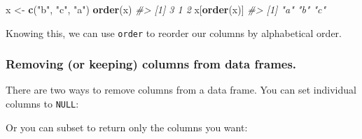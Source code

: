 \documentclass[]{book}
\newenvironment{Shaded}{\begin{snugshade}}{\end{snugshade}}
\newcommand{\KeywordTok}[1]{\textcolor[rgb]{0.13,0.29,0.53}{\textbf{#1}}}
\newcommand{\DataTypeTok}[1]{\textcolor[rgb]{0.13,0.29,0.53}{#1}}
\newcommand{\StringTok}[1]{\textcolor[rgb]{0.31,0.60,0.02}{#1}}
\newcommand{\CommentTok}[1]{\textcolor[rgb]{0.56,0.35,0.01}{\textit{#1}}}
\newcommand{\OtherTok}[1]{\textcolor[rgb]{0.56,0.35,0.01}{#1}}
\newcommand{\OperatorTok}[1]{\textcolor[rgb]{0.81,0.36,0.00}{\textbf{#1}}}
\newcommand{\NormalTok}[1]{#1}
\begin{document}
\begin{Shaded}
\begin{Highlighting}[]
\NormalTok{x <-}\StringTok{ }\KeywordTok{c}\NormalTok{(}\StringTok{"b"}\NormalTok{, }\StringTok{"c"}\NormalTok{, }\StringTok{"a"}\NormalTok{)}
\KeywordTok{order}\NormalTok{(x)}
\CommentTok{#> [1] 3 1 2}
\NormalTok{x[}\KeywordTok{order}\NormalTok{(x)]}
\CommentTok{#> [1] "a" "b" "c"}
\end{Highlighting}
\end{Shaded}

Knowing this, we can use \texttt{order} to reorder our columns by
alphabetical order.

\subsubsection*{Removing (or keeping) columns from data
frames.}\label{removing-or-keeping-columns-from-data-frames.}

There are two ways to remove columns from a data frame. You can set
individual columns to \texttt{NULL}:

\begin{Shaded}
\end{Shaded}

Or you can subset to return only the columns you want:
\end{document}
